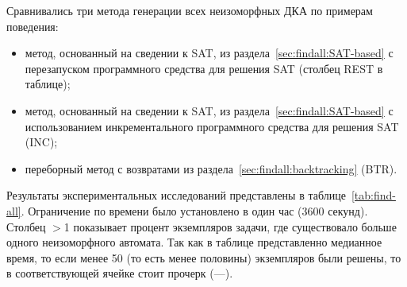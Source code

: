Сравнивались три метода генерации всех неизоморфных ДКА по примерам поведения:
\begin{itemize}
  \item метод, основанный на сведении к SAT, из раздела~\ref{sec:findall:SAT-based} с перезапуском программного средства для решения SAT (столбец REST в таблице);
  \item метод, основанный на сведении к SAT, из раздела~\ref{sec:findall:SAT-based} с использованием инкрементального программного средства для решения SAT (INC);
  \item переборный метод с возвратами из раздела~\ref{sec:findall:backtracking} (BTR).
\end{itemize}
Результаты экспериментальных исследований представлены в таблице~\ref{tab:find-all}.
Ограничение по времени было установлено в один час (3600 секунд).
Столбец $>$1 показывает процент экземпляров задачи, где существовало больше одного неизоморфного автомата.
Так как в таблице представленно медианное время, то если менее 50 (то есть менее половины) экземпляров были решены, то в соответствующей ячейке стоит прочерк (---).

